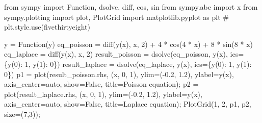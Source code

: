 \documentclass[
  a4paper,
  DIV=11,
  numbers=noendperiod]{scrreprt}
\newenvironment{Shaded}{\begin{snugshade}}{\end{snugshade}}
\newcommand{\CommentTok}[1]{\textcolor[rgb]{0.37,0.37,0.37}{#1}}
\newcommand{\DecValTok}[1]{\textcolor[rgb]{0.68,0.00,0.00}{#1}}
\newcommand{\FloatTok}[1]{\textcolor[rgb]{0.68,0.00,0.00}{#1}}
\newcommand{\ImportTok}[1]{\textcolor[rgb]{0.00,0.46,0.62}{#1}}
\newcommand{\NormalTok}[1]{\textcolor[rgb]{0.00,0.23,0.31}{#1}}
\newcommand{\OperatorTok}[1]{\textcolor[rgb]{0.37,0.37,0.37}{#1}}
\newcommand{\StringTok}[1]{\textcolor[rgb]{0.13,0.47,0.30}{#1}}
\newcommand{\VariableTok}[1]{\textcolor[rgb]{0.07,0.07,0.07}{#1}}
\begin{document}
\begin{Shaded}
\begin{Highlighting}[]
\ImportTok{from}\NormalTok{ sympy }\ImportTok{import}\NormalTok{ Function, dsolve, diff, cos, sin}
\ImportTok{from}\NormalTok{ sympy.abc }\ImportTok{import}\NormalTok{ x}
\ImportTok{from}\NormalTok{ sympy.plotting }\ImportTok{import}\NormalTok{ plot, PlotGrid}
\ImportTok{import}\NormalTok{ matplotlib.pyplot }\ImportTok{as}\NormalTok{ plt}
\CommentTok{\# plt.style.use(\textquotesingle{}fivethirtyeight\textquotesingle{})}

\NormalTok{y }\OperatorTok{=}\NormalTok{ Function(}\StringTok{\textquotesingle{}y\textquotesingle{}}\NormalTok{)}
\NormalTok{eq\_poisson }\OperatorTok{=}\NormalTok{ diff(y(x), x, }\DecValTok{2}\NormalTok{) }\OperatorTok{+} \DecValTok{4} \OperatorTok{*}\NormalTok{ cos(}\DecValTok{4} \OperatorTok{*}\NormalTok{ x) }\OperatorTok{+} \DecValTok{8} \OperatorTok{*}\NormalTok{ sin(}\DecValTok{8} \OperatorTok{*}\NormalTok{ x)}
\NormalTok{eq\_laplace }\OperatorTok{=}\NormalTok{ diff(y(x), x, }\DecValTok{2}\NormalTok{)}
\NormalTok{result\_poisson }\OperatorTok{=}\NormalTok{ dsolve(eq\_poisson, y(x), ics}\OperatorTok{=}\NormalTok{\{y(}\DecValTok{0}\NormalTok{): }\DecValTok{1}\NormalTok{, y(}\DecValTok{1}\NormalTok{): }\DecValTok{0}\NormalTok{\})}
\NormalTok{result\_laplace }\OperatorTok{=}\NormalTok{ dsolve(eq\_laplace, y(x), ics}\OperatorTok{=}\NormalTok{\{y(}\DecValTok{0}\NormalTok{): }\DecValTok{1}\NormalTok{, y(}\DecValTok{1}\NormalTok{): }\DecValTok{0}\NormalTok{\})}
\NormalTok{p1 }\OperatorTok{=}\NormalTok{ plot(result\_poisson.rhs, (x, }\DecValTok{0}\NormalTok{, }\DecValTok{1}\NormalTok{), }
\NormalTok{      ylim}\OperatorTok{=}\NormalTok{(}\OperatorTok{{-}}\FloatTok{0.2}\NormalTok{, }\FloatTok{1.2}\NormalTok{), }
\NormalTok{      ylabel}\OperatorTok{=}\StringTok{\textquotesingle{}y(x)\textquotesingle{}}\NormalTok{, }
\NormalTok{      axis\_center}\OperatorTok{=}\StringTok{\textquotesingle{}auto\textquotesingle{}}\NormalTok{,}
\NormalTok{      show}\OperatorTok{=}\VariableTok{False}\NormalTok{,}
\NormalTok{      title}\OperatorTok{=}\StringTok{\textquotesingle{}Poisson equation\textquotesingle{}}\NormalTok{)}\OperatorTok{;}
\NormalTok{p2 }\OperatorTok{=}\NormalTok{ plot(result\_laplace.rhs, (x, }\DecValTok{0}\NormalTok{, }\DecValTok{1}\NormalTok{), }
\NormalTok{      ylim}\OperatorTok{=}\NormalTok{(}\OperatorTok{{-}}\FloatTok{0.2}\NormalTok{, }\FloatTok{1.2}\NormalTok{), }
\NormalTok{      ylabel}\OperatorTok{=}\StringTok{\textquotesingle{}y(x)\textquotesingle{}}\NormalTok{, }
\NormalTok{      axis\_center}\OperatorTok{=}\StringTok{\textquotesingle{}auto\textquotesingle{}}\NormalTok{,}
\NormalTok{      show}\OperatorTok{=}\VariableTok{False}\NormalTok{,}
\NormalTok{      title}\OperatorTok{=}\StringTok{\textquotesingle{}Laplace equation\textquotesingle{}}\NormalTok{)}\OperatorTok{;}
\NormalTok{PlotGrid(}\DecValTok{1}\NormalTok{, }\DecValTok{2}\NormalTok{, p1, p2, size}\OperatorTok{=}\NormalTok{(}\DecValTok{7}\NormalTok{,}\DecValTok{3}\NormalTok{))}\OperatorTok{;}
\end{Highlighting}
\end{Shaded}
\end{document}
